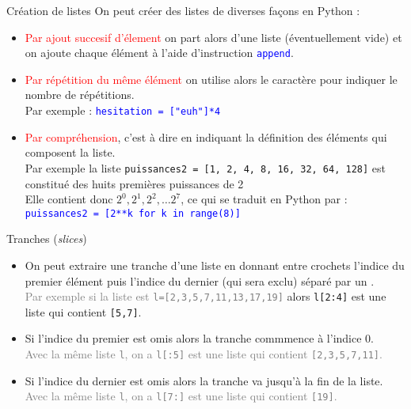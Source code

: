 \documentclass[10pt]{beamer}
\begin{document}
\begin{frame}[fragile]{\Ctitle}{\stitle}
	\begin{alertblock}{Création de listes}
		On peut créer des listes de diverses façons en Python :
		\begin{itemize}
			\item<2-> \textcolor{red}{Par ajout succesif d'élement} on part alors d'une liste (éventuellement vide) et on ajoute chaque élément à l'aide d'instruction \textcolor{blue}{\tt append}.
			\item<3-> \textcolor{red}{Par répétition du même élément} on utilise alors le caractère \textcolor{blue}{\tt *} pour indiquer le nombre de répétitions. \\
			      \onslide<4-> {Par exemple : \textcolor{blue}{\tt hesitation = ["euh"]*4}}
			\item<6->	 \textcolor{red}{Par compréhension}, c'est à dire en indiquant la définition des éléments qui composent la liste. \\
			      \onslide<7-> {Par exemple la liste {\tt puissances2 = [1, 2, 4, 8, 16, 32, 64, 128]} est constitué des huits premières puissances de 2} \\
			      \onslide<8-> {Elle contient donc $2^0, 2^1, 2^2, \dots 2^7$, ce qui se traduit en Python par :}\\
			      \onslide<9-> \textcolor{blue}{\tt puissances2 = [2**k for k in range(8)]}
		\end{itemize}
	\end{alertblock}
\end{frame}

\begin{frame}[fragile]{\Ctitle}{\stitle}
	\begin{alertblock}{Tranches (\textit{slices})}
		\begin{itemize}
		\item<1->On peut extraire une tranche d'une liste en donnant entre crochets l'indice du premier élément puis l'indice du dernier (qui sera exclu) séparé par un \kw{:}.\\
		\onslide<2->\textcolor{gray}{\small Par exemple si la liste est {\tt l=[2,3,5,7,11,13,17,19]}} alors {\tt l[2:4]} est une liste qui contient {\tt [5,7]}.
		\item<3-> Si l'indice du premier est omis alors la tranche commmence à l'indice 0.\\
		\onslide<4->\textcolor{gray}{\small Avec la même liste {\tt l}, on a {\tt l[:5]} est une liste qui contient {\tt [2,3,5,7,11]}.}
		\item<5-> Si l'indice du dernier est omis alors la tranche va jusqu'à la fin de la liste.\\
		\onslide<6->\textcolor{gray}{\small Avec la même liste {\tt l}, on a {\tt l[7:]} est une liste qui contient {\tt [19]}.}
		\end{itemize}
	\end{alertblock}
\end{frame}
\end{document}
